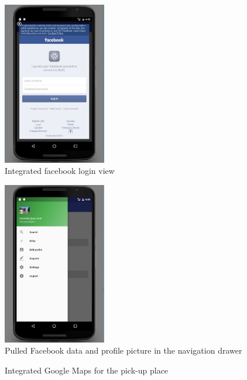 \documentclass[11pt,twoside,a4paper]{report}
\begin{document}
\begin{appendices}
\begin{figure}
	\centering
	\includegraphics[width=0.4\textwidth]{jpg/facebook2.jpg}
	\caption{Integrated facebook login view}
	\label{figure:search-view}
\end{figure}

\begin{figure}
	\centering
	\includegraphics[width=0.4\textwidth]{jpg/facebook3.jpg}
	\caption{Pulled Facebook data and profile picture in the navigation drawer}
	\label{figure:specify-search-view}
\end{figure}

\begin{figure}
	\centering
	\caption{Integrated Google Maps for the pick-up place}
	\label{figure:overview}
\end{figure}

\end{appendices}
\end{document}
